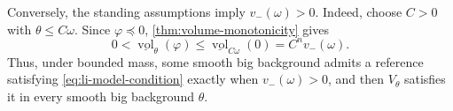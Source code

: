 Conversely, the standing assumptions imply $v_-(\omega)>0$. Indeed, choose $C>0$ with $\theta\leq C\omega$. Since $\varphi\preceq0$, \cref{thm:volume-monotonicity} gives
\[
 0<\underline{\operatorname{vol}}_\theta(\varphi)
 \leq\underline{\operatorname{vol}}_{C\omega}(0)
 =C^n v_-(\omega).
\]
Thus, under bounded mass, some smooth big background admits a reference satisfying \eqref{eq:li-model-condition} exactly when $v_-(\omega)>0$, and then $V_\theta$ satisfies it in every smooth big background $\theta$.
